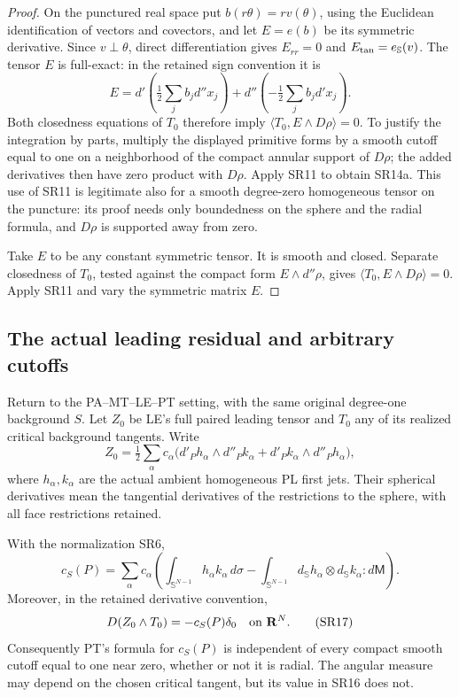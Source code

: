 \begin{proof}
On the punctured real space put $b(r\theta)=r v(\theta)$,
using the Euclidean identification of vectors and covectors,
and let $E=e(b)$ be its symmetric derivative.  Since
$v\perp\theta$, direct differentiation gives
$E_{rr}=0$ and $E_{\rm tan}=e_{\mathbb S}(v)$.  The tensor
$E$ is full-exact: in the retained sign convention it is
\[
 E=d'\!\left(\tfrac12\sum_jb_jd''x_j\right)
           +d''\!\left(-\tfrac12\sum_jb_jd'x_j\right).
\]
Both closedness equations of $T_0$ therefore imply
$\langle T_0,E\wedge D\rho\rangle=0$.  To justify the
integration by parts, multiply the displayed primitive
forms by a smooth cutoff equal to one on a neighborhood
of the compact annular support of $D\rho$; the added
derivatives then have zero product with $D\rho$.
Apply SR11 to obtain SR14a.  This use of SR11 is legitimate
also for a smooth degree-zero homogeneous tensor on the
puncture: its proof needs only boundedness on the sphere
and the radial formula, and $D\rho$ is supported away
from zero.

Take $E$ to be any constant symmetric tensor.  It is smooth
and closed.  Separate closedness of $T_0$, tested against
the compact form $E\wedge d''\rho$, gives
$\langle T_0,E\wedge D\rho\rangle=0$.
Apply SR11 and vary the symmetric matrix $E$.
\end{proof}

\subsection{The actual leading residual and arbitrary cutoffs}

Return to the PA--MT--LE--PT setting, with the same original
degree-one background $S$.  Let $Z_0$ be LE's full paired
leading tensor and $T_0$ any of its realized critical
background tangents.  Write
\[
 Z_0=\tfrac12\sum_\alpha c_\alpha
       \bigl(d'_P h_\alpha\wedge d''_P k_\alpha
                +d'_P k_\alpha\wedge d''_P h_\alpha\bigr),
 \tag{SR15}
\]
where $h_\alpha,k_\alpha$ are the actual ambient homogeneous
PL first jets.  Their spherical derivatives mean the
tangential derivatives of the restrictions to the sphere,
with all face restrictions retained.

\begin{theorem}
\label{thm:r13-spherical-realized-residual}
With the normalization SR6,
\[
\boxed{
c_S(P)=\sum_\alpha c_\alpha
  \left(\int_{\mathbb S^{N-1}}h_\alpha k_\alpha\,d\sigma
    -\int_{\mathbb S^{N-1}}
                  d_{\mathbb S}h_\alpha\otimes
                         d_{\mathbb S}k_\alpha:d\mathsf M\right).}
 \tag{SR16}
\]
Moreover, in the retained derivative convention,
\[
                     D(Z_0\wedge T_0)=-c_S(P)\delta_0
                                  \quad\hbox{on }\mathbf R^N.
 \tag{SR17}
\]
Consequently PT's formula for $c_S(P)$ is independent of
every compact smooth cutoff equal to one near zero, whether
or not it is radial.  The angular measure may depend on the
chosen critical tangent, but its value in SR16 does not.
\end{theorem}

